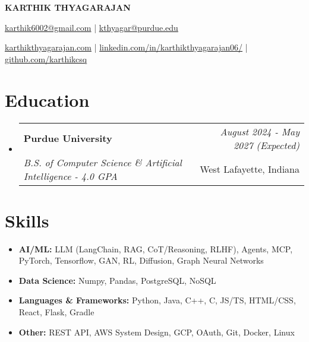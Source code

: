 \documentclass[a4paper,11pt]{article}
\makeatletter
\newcommand{\resumeItem}[2]{
  \item{
    \textbf{#1}{\hspace{0.5mm}#2 \vspace{-0.5mm}}
  }
}
\newcommand{\resumeSubheading}[4]{
\vspace{0.5mm}\item
    \begin{tabular*}{0.98\textwidth}[t]{l@{\extracolsep{\fill}}r}
        \textbf{#1} & \textit{\footnotesize{#4}} \\
        \textit{\footnotesize{#3}} &  \footnotesize{#2}\\
    \end{tabular*}
    \vspace{-2.4mm}
}
\newcommand{\resumeSubItem}[2]{\resumeItem{#1}{#2}\vspace{-4pt}}
\newcommand{\resumeSubHeadingListStart}{\begin{itemize}[leftmargin=*,labelsep=1mm]}
\newcommand{\resumeHeadingSkillStart}{\begin{itemize}[leftmargin=*,itemsep=1.7mm, rightmargin=2ex]}
\newcommand{\resumeSubHeadingListEnd}{\end{itemize}\vspace{2mm}}
\newcommand{\resumeHeadingSkillEnd}{\end{itemize}\vspace{-2mm}}
\newcommand{\socialicon}[1]{\raisebox{-0.05em}{\resizebox{!}{1em}{#1}}}
\newcommand{\headerfontiii}{\fontfamily{ppl}\selectfont} %
\makeatother
\begin{document}
\headerfontiii

\begin{center}
    {\Huge\textbf{KARTHIK THYAGARAJAN}}
\end{center}

\vspace{-5mm}

\begin{center}
    \small{
    \href{karthik6002@gmail.com}{karthik6002@gmail.com} | 
    \href{kthyagar@purdue.edu}{kthyagar@purdue.edu}
    
    \href{https://www.karthikthyagarajan.com}
    {karthikthyagarajan.com} | 
    \socialicon{\faLinkedin} \href{https://www.linkedin.com/in/karthikthyagarajan06}{linkedin.com/in/karthikthyagarajan06/} | 
    \socialicon{\faGithub} \href{https://github.com/karthikcsq}{github.com/karthikcsq} 
    }
\end{center}

\vspace{-6mm}

\section{\textbf{Education}}
\resumeSubHeadingListStart


  \resumeSubheading
  { Purdue University }
  { West Lafayette, Indiana }
  { B.S. of Computer Science \& Artificial Intelligence - 4.0 GPA }
  { August 2024 - May 2027 (Expected) }


\resumeSubHeadingListEnd

\vspace{-6mm}

\section{\textbf{Skills}}
\resumeHeadingSkillStart

  \resumeSubItem{AI/ML: }{LLM (LangChain, RAG, CoT/Reasoning, RLHF), Agents, MCP, PyTorch, Tensorflow, GAN, RL, Diffusion, Graph Neural Networks}

  \resumeSubItem{Data Science: }{Numpy, Pandas, PostgreSQL, NoSQL}

  \resumeSubItem{Languages \& Frameworks: }{Python, Java, C++, C, JS/TS, HTML/CSS, React, Flask, Gradle}

  \resumeSubItem{Other: }{REST API, AWS System Design, GCP, OAuth, Git, Docker, Linux}

\resumeHeadingSkillEnd

\vspace{-2mm}
\end{document}

